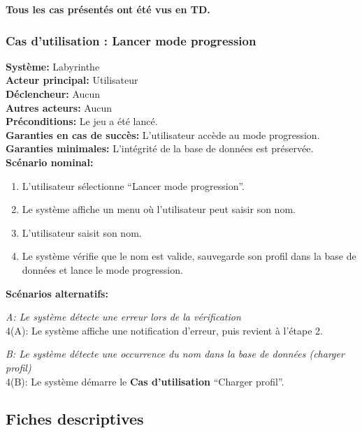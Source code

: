 \documentclass{butexFR}
\begin{document}
\textbf{Tous les cas présentés ont été vus en TD.}

\newpage

\subsubsection{Cas d'utilisation : Lancer mode progression}
\textbf{Système:} Labyrinthe\\
\textbf{Acteur principal:} Utilisateur\\
\textbf{Déclencheur:} Aucun\\
\textbf{Autres acteurs:} Aucun\\
\textbf{Préconditions:} Le jeu a été lancé.\\
\textbf{Garanties en cas de succès:} L'utilisateur accède au mode progression.\\
\textbf{Garanties minimales:} L'intégrité de la base de données est préservée.\\
\textbf{Scénario nominal:}
\begin{enumerate}
    \item L'utilisateur sélectionne ``Lancer mode progression''.
    \item Le système affiche un menu où l'utilisateur peut saisir son nom.
    \item L'utilisateur saisit son nom.
    \item Le système vérifie que le nom est valide, sauvegarde son profil dans la base de données et lance le mode progression.
\end{enumerate}
\textbf{Scénarios alternatifs:}

\emph{A: Le système détecte une erreur lors de la vérification}\\
\hspace*{1em}4(A): Le système affiche une notification d'erreur, puis revient à l'étape 2.

\emph{B: Le système détecte une occurrence du nom dans la base de données (charger profil)}\\
\hspace*{1em}4(B): Le système démarre le \textbf{Cas d'utilisation} ``Charger profil''.

\newpage

\subsection{Fiches descriptives}
\end{document}
